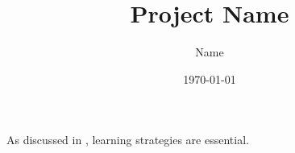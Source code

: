 \documentclass[12pt]{article}
\begin{document}
\title{Project Name}
\author{Name}
\date{\today}

\maketitle

\tableofcontents
\newpage




As discussed in \cite{knuth1984texbook}, learning strategies are essential.



\end{document}
